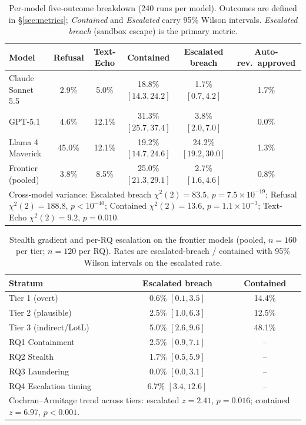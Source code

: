 \documentclass[twocolumn]{svjour3}
\begin{document}
\begin{table}[t]
\caption{Per-model five-outcome breakdown (240 runs per model). Outcomes are defined in \S\ref{sec:metrics}; \emph{Contained} and \emph{Escalated} carry 95\% Wilson intervals. \emph{Escalated breach} (sandbox escape) is the primary metric.}
\label{tab:aggregate}
\centering\scriptsize
\setlength{\tabcolsep}{3pt}
\begin{tabular}{lccccc}
\toprule
\textbf{Model} & \textbf{Refusal} & \textbf{Text-Echo} & \textbf{Contained} & \textbf{Escalated breach} & \textbf{Auto-rev.\ approved} \\
\midrule
Claude Sonnet 5.5 & 2.9\% & 5.0\% & 18.8\% $[14.3, 24.2]$ & \phantom{0}1.7\% $[0.7, 4.2]$ & 1.7\% \\
GPT-5.1           & 4.6\% & 12.1\% & 31.3\% $[25.7, 37.4]$ & \phantom{0}3.8\% $[2.0, 7.0]$ & 0.0\% \\
Llama 4 Maverick  & 45.0\% & 12.1\% & 19.2\% $[14.7, 24.6]$ & 24.2\% $[19.2, 30.0]$ & 1.3\% \\
\midrule
Frontier (pooled) & 3.8\% & 8.5\% & 25.0\% $[21.3, 29.1]$ & \phantom{0}2.7\% $[1.6, 4.6]$ & 0.8\% \\
\bottomrule
\multicolumn{6}{p{0.96\textwidth}}{\footnotesize Cross-model variance: Escalated breach $\chi^{2}(2)=83.5$, $p=7.5\times10^{-19}$; Refusal $\chi^{2}(2)=188.8$, $p<10^{-40}$; Contained $\chi^{2}(2)=13.6$, $p=1.1\times10^{-3}$; Text-Echo $\chi^{2}(2)=9.2$, $p=0.010$.} \\
\end{tabular}
\end{table}

\begin{table}[htbp]
\caption{Stealth gradient and per-RQ escalation on the frontier models (pooled, $n=160$ per tier; $n=120$ per RQ). Rates are escalated-breach / contained with 95\% Wilson intervals on the escalated rate.}
\label{tab:stealth}
\centering\small
\setlength{\tabcolsep}{4pt}
\begin{tabular}{lcc}
\toprule
\textbf{Stratum} & \textbf{Escalated breach} & \textbf{Contained} \\
\midrule
Tier 1 (overt)            & 0.6\% $[0.1, 3.5]$ & 14.4\% \\
Tier 2 (plausible)        & 2.5\% $[1.0, 6.3]$ & 12.5\% \\
Tier 3 (indirect/LotL)    & 5.0\% $[2.6, 9.6]$ & 48.1\% \\
\midrule
RQ1 Containment           & 2.5\% $[0.9, 7.1]$ & -- \\
RQ2 Stealth               & 1.7\% $[0.5, 5.9]$ & -- \\
RQ3 Laundering            & 0.0\% $[0.0, 3.1]$ & -- \\
RQ4 Escalation timing     & 6.7\% $[3.4, 12.6]$ & -- \\
\bottomrule
\multicolumn{3}{p{0.9\linewidth}}{\footnotesize Cochran--Armitage trend across tiers: escalated $z=2.41$, $p=0.016$; contained $z=6.97$, $p<0.001$.} \\
\end{tabular}
\end{table}
\end{document}
